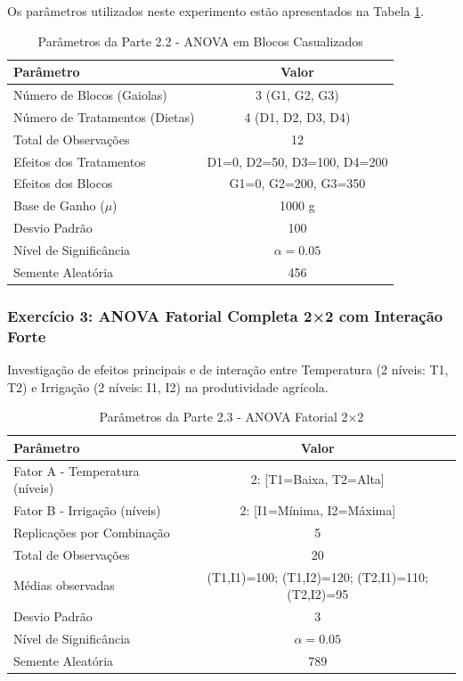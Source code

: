\documentclass[12pt,a4paper,oneside]{article}
\begin{document}
Os parâmetros utilizados neste experimento estão apresentados na Tabela \ref{tab:param_parte2_2}.

\begin{table}[H]
\centering
\begin{tabular}{|l|c|}
\hline
\textbf{Parâmetro} & \textbf{Valor} \\
\hline
Número de Blocos (Gaiolas) & 3 (G1, G2, G3) \\
Número de Tratamentos (Dietas) & 4 (D1, D2, D3, D4) \\
Total de Observações & 12 \\
Efeitos dos Tratamentos & D1=0, D2=50, D3=100, D4=200 \\
Efeitos dos Blocos & G1=0, G2=200, G3=350 \\
Base de Ganho ($\mu$) & 1000 g \\
Desvio Padrão & 100 \\
Nível de Significância & $\alpha = 0.05$ \\
Semente Aleatória & 456 \\
\hline
\end{tabular}
\caption{Parâmetros da Parte 2.2 - ANOVA em Blocos Casualizados}
\label{tab:param_parte2_2}
\end{table}

\subsubsection{Exercício 3: ANOVA Fatorial Completa 2×2 com Interação Forte}

Investigação de efeitos principais e de interação entre Temperatura (2 níveis: T1, T2) e Irrigação (2 níveis: I1, I2) na produtividade agrícola.

\begin{table}[H]
\centering
\begin{tabular}{|l|c|}
\hline
\textbf{Parâmetro} & \textbf{Valor} \\
\hline
Fator A - Temperatura (níveis) & 2: [T1=Baixa, T2=Alta] \\
Fator B - Irrigação (níveis) & 2: [I1=Mínima, I2=Máxima] \\
Replicações por Combinação & 5 \\
Total de Observações & 20 \\
Médias observadas & (T1,I1)=100; (T1,I2)=120; (T2,I1)=110; (T2,I2)=95 \\
Desvio Padrão & 3 \\
Nível de Significância & $\alpha = 0.05$ \\
Semente Aleatória & 789 \\
\hline
\end{tabular}
\caption{Parâmetros da Parte 2.3 - ANOVA Fatorial 2×2}
\label{tab:param_parte2_3}
\end{table}
\end{document}
